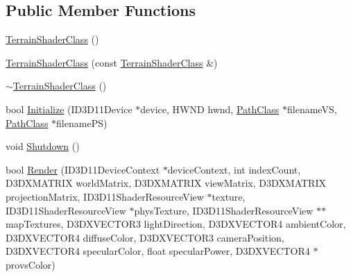 \subsection*{Public Member Functions}
\begin{DoxyCompactItemize}
\item 
\hyperlink{class_terrain_shader_class_a34b70b3d175e940b3635e11956464cd5}{Terrain\+Shader\+Class} ()
\item 
\hyperlink{class_terrain_shader_class_ac3794b670bd3d00c77e8018c77a7810c}{Terrain\+Shader\+Class} (const \hyperlink{class_terrain_shader_class}{Terrain\+Shader\+Class} \&)
\item 
\hyperlink{class_terrain_shader_class_a91ab9b29dbcab8f120a585cde5bc6e5a}{$\sim$\+Terrain\+Shader\+Class} ()
\item 
bool \hyperlink{class_terrain_shader_class_aee1efb3f5ffc6b75f0b7eaa22f1ed121}{Initialize} (I\+D3\+D11\+Device $\ast$device, H\+W\+ND hwnd, \hyperlink{class_path_class}{Path\+Class} $\ast$filename\+VS, \hyperlink{class_path_class}{Path\+Class} $\ast$filename\+PS)
\item 
void \hyperlink{class_terrain_shader_class_afdd2964914bb617b141495b6eb6df4b2}{Shutdown} ()
\item 
bool \hyperlink{class_terrain_shader_class_ad28c79d69138b9383be7ada8756e9d4f}{Render} (I\+D3\+D11\+Device\+Context $\ast$device\+Context, int index\+Count, D3\+D\+X\+M\+A\+T\+R\+IX world\+Matrix, D3\+D\+X\+M\+A\+T\+R\+IX view\+Matrix, D3\+D\+X\+M\+A\+T\+R\+IX projection\+Matrix, I\+D3\+D11\+Shader\+Resource\+View $\ast$texture, I\+D3\+D11\+Shader\+Resource\+View $\ast$phys\+Texture, I\+D3\+D11\+Shader\+Resource\+View $\ast$$\ast$map\+Textures, D3\+D\+X\+V\+E\+C\+T\+O\+R3 light\+Direction, D3\+D\+X\+V\+E\+C\+T\+O\+R4 ambient\+Color, D3\+D\+X\+V\+E\+C\+T\+O\+R4 diffuse\+Color, D3\+D\+X\+V\+E\+C\+T\+O\+R3 camera\+Position, D3\+D\+X\+V\+E\+C\+T\+O\+R4 specular\+Color, float specular\+Power, D3\+D\+X\+V\+E\+C\+T\+O\+R4 $\ast$provs\+Color)
\end{DoxyCompactItemize}
